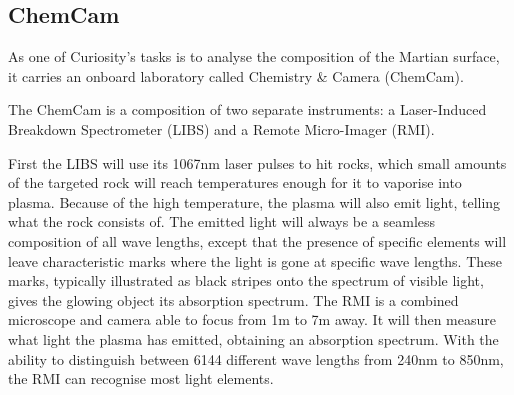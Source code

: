 \subsection{ChemCam}
As one of Curiosity's tasks is to analyse the composition of the Martian surface, it carries an onboard laboratory called Chemistry \& Camera (ChemCam).

The ChemCam is a composition of two separate instruments: a Laser-Induced Breakdown Spectrometer (LIBS) and a Remote Micro-Imager (RMI).

First the LIBS will use its 1067nm laser pulses to hit rocks, which small amounts of the targeted rock will reach temperatures enough for it to vaporise into plasma.
Because of the high temperature, the plasma will also emit light, telling what the rock consists of.
The emitted light will always be a seamless composition of all wave lengths, except that the presence of specific elements will leave characteristic marks where the light is gone at specific wave lengths.
These marks, typically illustrated as black stripes onto the spectrum of visible light, gives the glowing object its absorption spectrum.
The RMI is a combined microscope and camera able to focus from 1m to 7m away.
It will then measure what light the plasma has emitted, obtaining an absorption spectrum.
With the ability to distinguish between 6144 different wave lengths from 240nm to 850nm, the RMI can recognise most light elements. \cite{ChemCam}